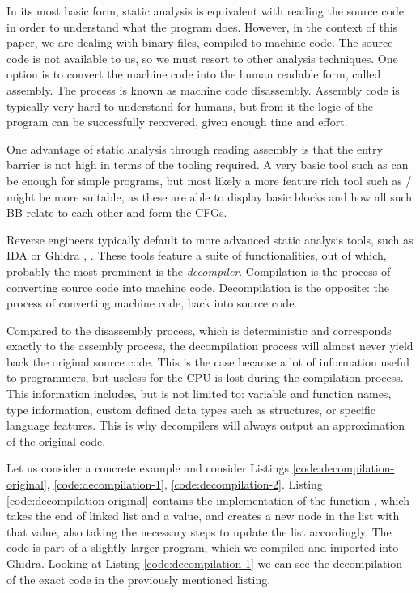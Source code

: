 In its most basic form, static analysis is equivalent with reading the source code in order to understand what the program does. However, in the context of this paper, we are dealing with binary files, compiled to machine code. The source code is not available to us, so we must resort to other analysis techniques. One option is to convert the machine code into the human readable form, called assembly. The process is known as machine code disassembly. Assembly code is typically very hard to understand for humans, but from it the logic of the program can be successfully recovered, given enough time and effort. 

One advantage of static analysis through reading assembly is that the entry barrier is not high in terms of the tooling required. A very basic tool such as  \cite{objdump} can be enough for simple programs, but most likely a more feature rich tool such as / \cite{cutter} might be more suitable, as these are able to display basic blocks and how all such \gls{BB} relate to each other and form the \glspl{CFG}.

Reverse engineers typically default to more advanced static analysis tools, such as IDA or Ghidra \cite{ida}, \cite{ghidra}. These tools feature a suite of functionalities, out of which, probably the most prominent is the \emph{decompiler}. Compilation is the process of converting source code into machine code. Decompilation is the opposite: the process of converting machine code, back into source code. 

Compared to the disassembly process, which is deterministic and corresponds exactly to the assembly process, the decompilation process will almost never yield back the original source code. This is the case because a lot of information useful to programmers, but useless for the \gls{CPU} is lost during the compilation process. This information includes, but is not limited to: variable and function names, type information, custom defined data types such as structures, or specific language features. This is why decompilers will always output an approximation of the original code. 

Let us consider a concrete example and consider Listings \ref{code:decompilation-original}, \ref{code:decompilation-1}, \ref{code:decompilation-2}. Listing \ref{code:decompilation-original} contains the implementation of the function , which takes the end of linked list and a value, and creates a new node in the list with that value, also taking the necessary steps to update the list accordingly. The code is part of a slightly larger  program, which we compiled and imported into Ghidra. Looking at Listing \ref{code:decompilation-1} we can see the decompilation of the exact code in the previously mentioned listing. 


